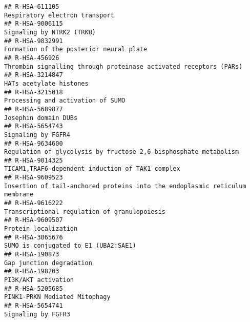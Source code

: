 \documentclass[
]{article}
\begin{document}
\begin{verbatim}
## R-HSA-611105                                                                                                        Respiratory electron transport
## R-HSA-9006115                                                                                                            Signaling by NTRK2 (TRKB)
## R-HSA-9832991                                                                                              Formation of the posterior neural plate
## R-HSA-456926                                                                     Thrombin signalling through proteinase activated receptors (PARs)
## R-HSA-3214847                                                                                                              HATs acetylate histones
## R-HSA-3215018                                                                                                    Processing and activation of SUMO
## R-HSA-5689877                                                                                                                 Josephin domain DUBs
## R-HSA-5654743                                                                                                                   Signaling by FGFR4
## R-HSA-9634600                                                                     Regulation of glycolysis by fructose 2,6-bisphosphate metabolism
## R-HSA-9014325                                                                                     TICAM1,TRAF6-dependent induction of TAK1 complex
## R-HSA-9609523                                                          Insertion of tail-anchored proteins into the endoplasmic reticulum membrane
## R-HSA-9616222                                                                                         Transcriptional regulation of granulopoiesis
## R-HSA-9609507                                                                                                                 Protein localization
## R-HSA-3065676                                                                                                 SUMO is conjugated to E1 (UBA2:SAE1)
## R-HSA-190873                                                                                                              Gap junction degradation
## R-HSA-198203                                                                                                                   PI3K/AKT activation
## R-HSA-5205685                                                                                                        PINK1-PRKN Mediated Mitophagy
## R-HSA-5654741                                                                                                                   Signaling by FGFR3

\end{verbatim}
\end{document}
